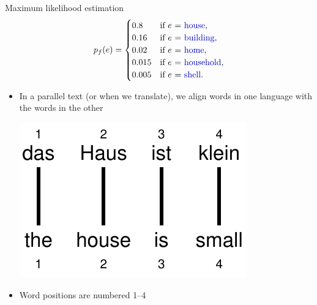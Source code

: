 \documentclass[landscape]{slides}
\newcommand{\example}[1]{\textcolor{darkblue}{\rm #1}}
\begin{document}

\vspace{20mm}
\begin{center}
Maximum likelihood estimation
\vspace{5mm}
\begin{equation*}
p_f(e) = 
\begin{cases}
0.8 &   \text{if $e$ = \example{house}}, \\
0.16 &  \text{if $e$ = \example{building}}, \\
0.02 &  \text{if $e$ = \example{home}}, \\
0.015 & \text{if $e$ = \example{household}}, \\
0.005 & \text{if $e$ = \example{shell}}.
\end{cases}
\end{equation*}
\end{center}


\begin{itemize}
\item In a parallel text (or when we translate), we align words in one language with the words in the other

\begin{center}
\includegraphics[scale=1.5]{haus-ist-klein-alignment.pdf}
\end{center}

\item Word positions are numbered 1--4
\end{itemize}

\end{document}
